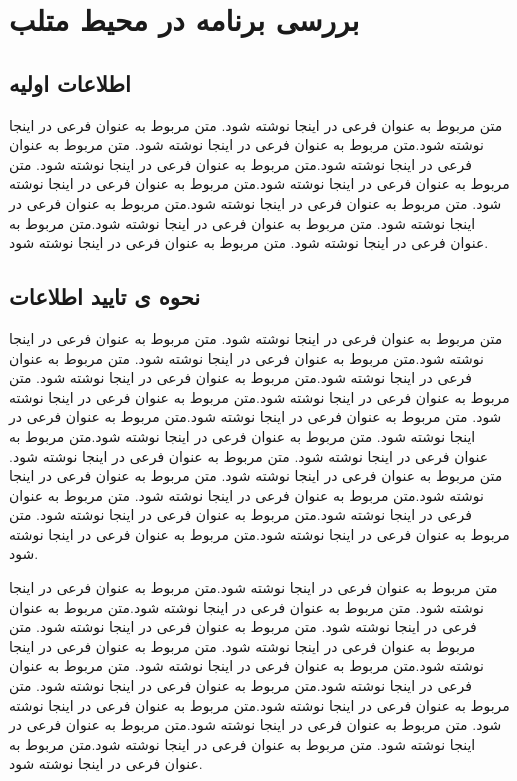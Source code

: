 \chapter{بررسی برنامه در محیط متلب}

\section{اطلاعات اولیه}
 متن مربوط به عنوان فرعی در اینجا نوشته شود. متن مربوط به عنوان فرعی در اینجا نوشته شود.متن مربوط به عنوان فرعی در اینجا نوشته شود. متن مربوط به عنوان فرعی در اینجا نوشته شود.متن مربوط به عنوان فرعی در اینجا نوشته شود. متن مربوط به عنوان فرعی در اینجا نوشته شود.متن مربوط به عنوان فرعی در اینجا نوشته شود. متن مربوط به عنوان فرعی در اینجا نوشته شود.متن مربوط به عنوان فرعی در اینجا نوشته شود. متن مربوط به عنوان فرعی در اینجا نوشته شود.متن مربوط به عنوان فرعی در اینجا نوشته شود. متن مربوط به عنوان فرعی در اینجا نوشته شود.
 
 \section{ نحوه ی تایید اطلاعات}
   متن مربوط به عنوان فرعی در اینجا نوشته شود. متن مربوط به عنوان فرعی در اینجا نوشته شود.متن مربوط به عنوان فرعی در اینجا نوشته شود. متن مربوط به عنوان فرعی در اینجا نوشته شود.متن مربوط به عنوان فرعی در اینجا نوشته شود. متن مربوط به عنوان فرعی در اینجا نوشته شود.متن مربوط به عنوان فرعی در اینجا نوشته شود. متن مربوط به عنوان فرعی در اینجا نوشته شود.متن مربوط به عنوان فرعی در اینجا نوشته شود. متن مربوط به عنوان فرعی در اینجا نوشته شود.متن مربوط به عنوان فرعی در اینجا نوشته شود. متن مربوط به عنوان فرعی در اینجا نوشته شود. متن مربوط به عنوان فرعی در اینجا نوشته شود. متن مربوط به عنوان فرعی در اینجا نوشته شود.متن مربوط به عنوان فرعی در اینجا نوشته شود. متن مربوط به عنوان فرعی در اینجا نوشته شود.متن مربوط به عنوان فرعی در اینجا نوشته شود. متن مربوط به عنوان فرعی در اینجا نوشته شود.متن مربوط به عنوان فرعی در اینجا نوشته شود.
   
    متن مربوط به عنوان فرعی در اینجا نوشته شود.متن مربوط به عنوان فرعی در اینجا نوشته شود. متن مربوط به عنوان فرعی در اینجا نوشته شود.متن مربوط به عنوان فرعی در اینجا نوشته شود. متن مربوط به عنوان فرعی در اینجا نوشته شود. متن مربوط به عنوان فرعی در اینجا نوشته شود. متن مربوط به عنوان فرعی در اینجا نوشته شود.متن مربوط به عنوان فرعی در اینجا نوشته شود. متن مربوط به عنوان فرعی در اینجا نوشته شود.متن مربوط به عنوان فرعی در اینجا نوشته شود. متن مربوط به عنوان فرعی در اینجا نوشته شود.متن مربوط به عنوان فرعی در اینجا نوشته شود. متن مربوط به عنوان فرعی در اینجا نوشته شود.متن مربوط به عنوان فرعی در اینجا نوشته شود. متن مربوط به عنوان فرعی در اینجا نوشته شود.متن مربوط به عنوان فرعی در اینجا نوشته شود. 
    
